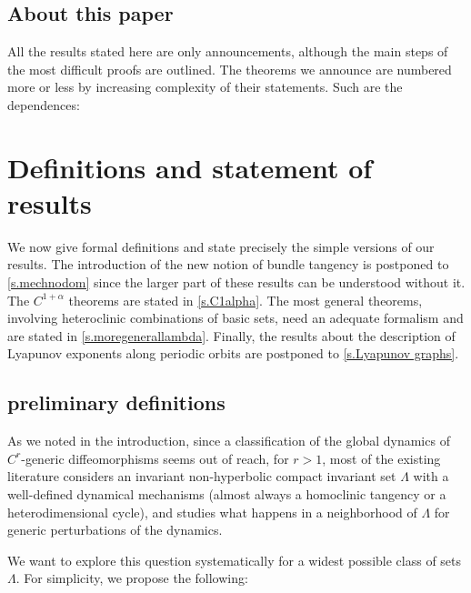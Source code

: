 \documentclass[11pt, a4paper]{amsart}
\theoremstyle{plain}
\theoremstyle{definition}
\theoremstyle{remark}
\numberwithin{equation}{section}         %
\begin{document}
\subsection{About this paper}

All the results stated here are only announcements, although the main steps of the most difficult proofs are outlined. The theorems we announce are numbered more or less by increasing complexity of their statements. Such are the dependences:

\begin{figure}[omitted: a diagram of this paper's results, not reproduced here]\end{figure}



\section{Definitions and statement of results}\label{s.defsandstatements}
We now give formal definitions and state precisely the simple versions of our results. The introduction of the new notion of bundle tangency is postponed to \cref{s.mechnodom} since the larger part of these results can be understood without it. The $C^{1+\alpha}$ theorems are stated in \cref{s.C1alpha}.
 The most general theorems, involving heteroclinic combinations of basic sets, need an adequate formalism and are stated in \cref{s.moregenerallambda}. Finally, the results about the description of Lyapunov exponents along periodic orbits are postponed to \cref{s.Lyapunov graphs}.






\subsection{preliminary definitions}\label{s.preldef}

As we noted in the introduction, since a  classification of the global dynamics of $C^r$-generic diffeomorphisms seems out of reach, for $r>1$, most of the existing literature considers an invariant non-hyperbolic compact invariant set $\Lambda$ with a well-defined dynamical mechanisms (almost always a homoclinic tangency or a heterodimensional cycle), and studies what happens in a neighborhood of $\Lambda$ for generic perturbations of the dynamics.

We want to explore this question systematically for a widest possible class of sets $\Lambda$.
For simplicity, we propose the following:
\end{document}
